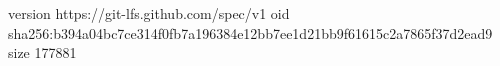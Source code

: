 version https://git-lfs.github.com/spec/v1
oid sha256:b394a04bc7ce314f0fb7a196384e12bb7ee1d21bb9f61615c2a7865f37d2ead9
size 177881
